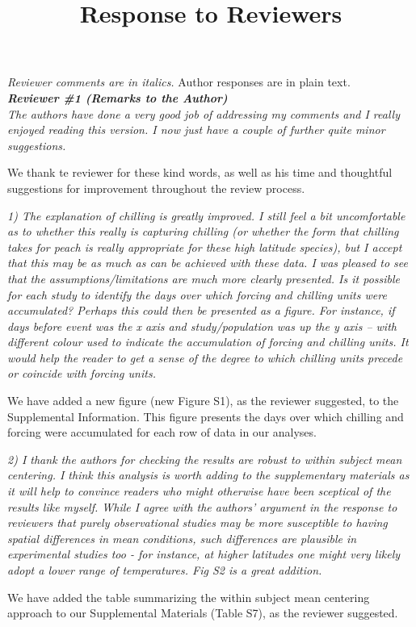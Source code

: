 \documentclass{article}
\begin{document}
\setlength\parindent{0pt}


\title{Response to Reviewers}
\emph{Reviewer comments are in italics.} Author responses are in plain text.\\

\emph{{\bf Reviewer \#1 (Remarks to the Author)}}\\

\emph{The authors have done a very good job of addressing my comments and I really enjoyed reading this version. I now just have a couple of further quite minor suggestions.}
\par We thank te reviewer for these kind words, as well as his time and thoughtful suggestions for improvement throughout the review process.

\par \emph{1) The explanation of chilling is greatly improved. I still feel a bit uncomfortable as to whether this really is capturing chilling (or whether the form that chilling takes for peach is really appropriate for these high latitude species), but I accept that this may be as much as can be achieved with these data. I was pleased to see that the assumptions/limitations are much more clearly presented. Is it possible for each study to identify the days over which forcing and chilling units were accumulated? Perhaps this could then be presented as a figure. For instance, if days before event was the x axis and study/population was up the y axis – with different colour used to indicate the accumulation of forcing and chilling units. It would help the reader to get a sense of the degree to which chilling units precede or coincide with forcing units.} 
\par We have added a new figure (new Figure S1), as the reviewer suggested, to the Supplemental Information. This figure presents the days over which chilling and forcing were accumulated for each row of data in our analyses. 
\par \emph{2) I thank the authors for checking the results are robust to within subject mean centering. I think this analysis is worth adding to the supplementary materials as it will help to convince readers who might otherwise have been sceptical of the results like myself. While I agree with the authors' argument in the response to reviewers that purely observational studies may be more susceptible to having spatial differences in mean conditions, such differences are plausible in experimental studies too -  for instance, at higher latitudes one might very likely adopt a lower range of temperatures. Fig S2 is a great addition. }
\par We have added the table summarizing the within subject mean centering approach to our Supplemental Materials (Table S7), as the reviewer suggested.
\end{document}
